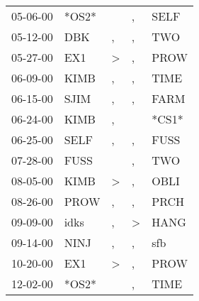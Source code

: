\begin{supertabular}{p{0.07\textwidth}p{0.06\textwidth}p{0.02\textwidth}p{0.02\textwidth}p{0.06\textwidth}}
 05-06-00\textsuperscript{} &                            *OS2* &                  &                , &           SELF\textsuperscript{} \\
 05-12-00\textsuperscript{} &            DBK\textsuperscript{} &                , &                , &            TWO\textsuperscript{} \\
 05-27-00\textsuperscript{} &            EX1\textsuperscript{} &     \textgreater &                , &           PROW\textsuperscript{} \\
 06-09-00\textsuperscript{} &           KIMB\textsuperscript{} &                , &                , &           TIME\textsuperscript{} \\
 06-15-00\textsuperscript{} &           SJIM\textsuperscript{} &                , &                , &           FARM\textsuperscript{} \\
 06-24-00\textsuperscript{} &           KIMB\textsuperscript{} &                , &                  &                            *CS1* \\
 06-25-00\textsuperscript{} &           SELF\textsuperscript{} &                , &                , &           FUSS\textsuperscript{} \\
 07-28-00\textsuperscript{} &           FUSS\textsuperscript{} &                  &                , &            TWO\textsuperscript{} \\
 08-05-00\textsuperscript{} &           KIMB\textsuperscript{} &     \textgreater &                , &           OBLI\textsuperscript{} \\
 08-26-00\textsuperscript{} &           PROW\textsuperscript{} &                , &                , &           PRCH\textsuperscript{} \\
 09-09-00\textsuperscript{} &           idks\textsuperscript{} &                , &     \textgreater &           HANG\textsuperscript{} \\
 09-14-00\textsuperscript{} &           NINJ\textsuperscript{} &                , &                , &            sfb\textsuperscript{} \\
 10-20-00\textsuperscript{} &            EX1\textsuperscript{} &     \textgreater &                , &           PROW\textsuperscript{} \\
 12-02-00\textsuperscript{} &                            *OS2* &                  &                , &           TIME\textsuperscript{} \\

\end{supertabular}
